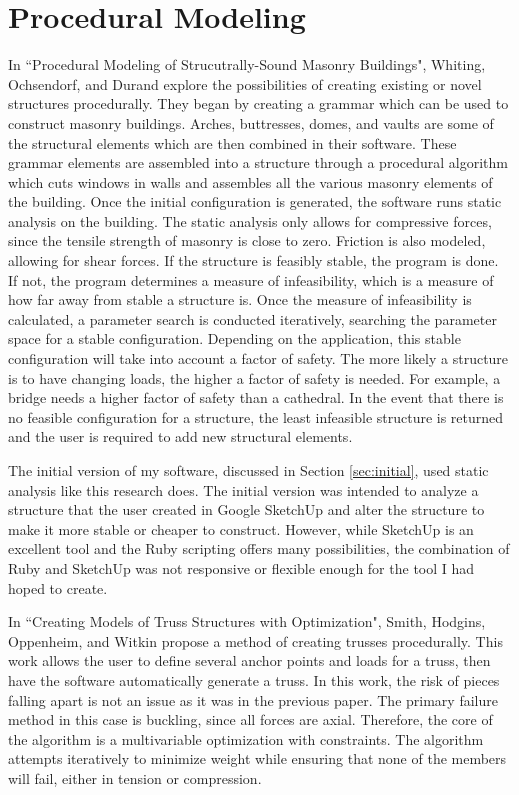 \documentclass{thesis}
\begin{document}
\section{Procedural Modeling}
In ``Procedural Modeling of Strucutrally-Sound Masonry Buildings"\cite{whiting:2009}, Whiting, Ochsendorf, and Durand explore
the possibilities of creating existing or novel structures procedurally.  They began by creating a grammar
which can be used to construct masonry buildings.  Arches, buttresses, domes, and vaults are some of the
structural elements which are then combined in their software.  These grammar elements are assembled into
a structure through a procedural algorithm which cuts windows in walls and assembles
all the various masonry elements of the building.  Once the initial configuration is
generated, the software runs static analysis on the building.  The static analysis only allows for compressive
forces, since the tensile strength of masonry is close to zero.  Friction is also modeled, allowing for shear
forces.  If the structure is feasibly stable, the program is done.  If not, the program determines a measure
of infeasibility, which is a measure of how far away from stable a structure is.  Once the measure
of infeasibility is calculated, a parameter search is conducted iteratively, searching the parameter space
for a stable configuration.  Depending on the application, this stable configuration will take into account
a factor of safety.  The more likely a structure is to have changing loads, the higher a factor of
safety is needed.  For example, a bridge needs a higher factor of safety than a cathedral.  In the event
that there is no feasible configuration for a structure, the least infeasible structure is returned and the
user is required to add new structural elements.

The initial version of my software, discussed in Section \ref{sec:initial}, used static analysis like this
research does.  The initial version was intended to analyze a structure that the user created in Google
SketchUp\cite{sketchup} and alter the structure to make it more stable or cheaper to construct.  However,
while SketchUp is an excellent tool and the Ruby scripting offers many possibilities, the combination of
Ruby and SketchUp was not responsive or flexible enough for the tool I had hoped to create.

In ``Creating Models of Truss Structures with Optimization"\cite{Carnegie02creatingmodels}, Smith, Hodgins,
Oppenheim, and Witkin propose a method of creating trusses procedurally.  This work allows the user to define
several anchor points and loads for a truss, then have the software automatically generate a truss.  In this
work, the risk of pieces falling apart is not an issue as it was in the previous paper.  The primary failure
method in this case is buckling, since all forces are axial.  Therefore, the core of the algorithm is a
multivariable optimization with constraints.  The algorithm attempts iteratively to minimize weight
while ensuring that none of the members will fail, either in tension or compression.
\end{document}

